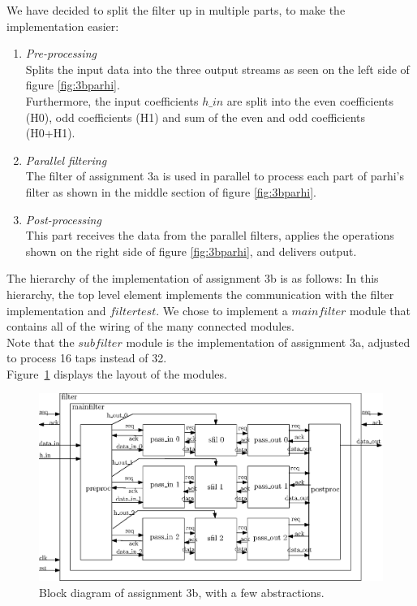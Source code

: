 \documentclass[a4paper,twoside,11pt, fleqn]{article}
\begin{document}
We have decided to split the filter up in multiple parts, to make the implementation easier:
\begin{enumerate}
	\item \textit{Pre-processing} \\
		Splits the input data into the three output streams as seen on the left side of figure	\ref{fig:3bparhi}. \\
		Furthermore, the input coefficients $h\_in$ are split into the even coefficients (H0), odd coefficients (H1) and sum of the even and odd coefficients (H0+H1).

	\item \textit{Parallel filtering} \\
	The filter of assignment 3a is used in parallel to process each part of parhi's filter as shown in the middle section of figure	\ref{fig:3bparhi}.
	
	\item \textit{Post-processing} \\
	This part receives the data from the parallel filters, applies the operations shown on the right side of figure \ref{fig:3bparhi}, and delivers output.
\end{enumerate}

The hierarchy of the implementation of assignment 3b is as follows: 
In this hierarchy, the top level element implements the communication with the filter implementation and $filtertest$. We chose to implement a $mainfilter$ module that contains all of the wiring of the many connected modules.\\

Note that the $subfilter$ module is the implementation of assignment 3a, adjusted to process 16 taps instead of 32.\\

Figure~\ref{fig:3bblockdiag} displays the layout of the modules.
\begin{figure}[h]
	\centering
	\includegraphics[scale=0.8]{./Images/3b_blockdiagram.eps}
	\caption{Block diagram of assignment 3b, with a few abstractions.}
	\label{fig:3bblockdiag}
\end{figure}
\end{document}
